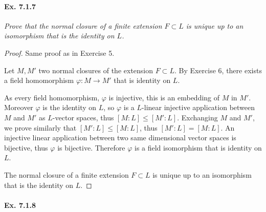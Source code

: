 \documentclass[11pt,a4paper]{article}
\begin{document}
\paragraph{Ex. 7.1.7}

{\it Prove that the normal closure of a finite extension $F \subset L$ is unique up to an isomorphism that is the identity on $L$.
}

\begin{proof}
Same proof as in Exercise 5.

Let $M,M'$ two normal closures of the extension $F \subset L$.
By Exercise 6, there exists a field homomorphism  $\varphi : M\to M'$ that is identity on $L$.

As every field homomorphism, $\varphi$ is injective, this is an embedding of $M$ in $M'$. Moreover $\varphi$ is the identity on $L$, so $\varphi$ is a $L$-linear injective application between  $M$ and $M'$ as $L$-vector spaces, thus $[M:L] \leq [M':L]$. Exchanging $M$ and $M'$, we prove similarly that $[M':L] \leq [M:L]$, thus $[M':L] = [M:L]$. An injective linear application between two same dimensional vector spaces is bijective, thus $\varphi$ is bijective. Therefore $\varphi$ is a field isomorphism that is identity on $L$.

The normal closure of a finite  extension $F \subset L$ is unique up to an isomorphism that is the identity on $L$.
\end{proof}

\paragraph{Ex. 7.1.8}
\end{document}
